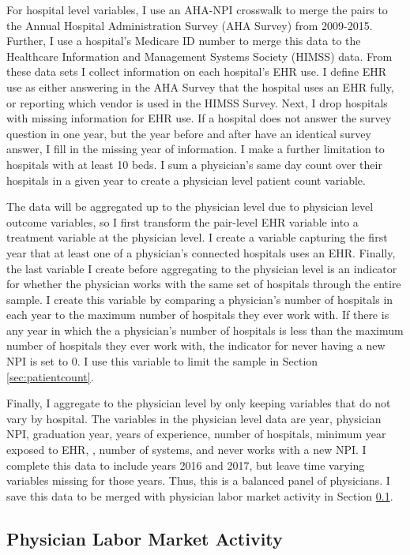 \documentclass[12pt]{article}
\begin{document}
For hospital level variables, I use an AHA-NPI crosswalk to merge the pairs to the Annual Hospital Administration Survey (AHA Survey) from 2009-2015. Further, I use a hospital's Medicare ID number to merge this data to the Healthcare Information and Management Systems Society (HIMSS) data. From these data sets I collect information on each hospital's EHR use. I define EHR use as either answering in the AHA Survey that the hospital uses an EHR fully, or reporting which vendor is used in the HIMSS Survey. Next, I drop hospitals with missing information for EHR use. If a hospital does not answer the survey question in one year, but the year before and after have an identical survey answer, I fill in the missing year of information. I make a further limitation to hospitals with at least 10 beds. I sum a physician's same day count over their hospitals in a given year to create a physician level patient count variable. 

The data will be aggregated up to the physician level due to physician level outcome variables, so I first transform the pair-level EHR variable into a treatment variable at the physician level. I create a variable capturing the first year that at least one of a physician's connected hospitals uses an EHR. Finally, the last variable I create before aggregating to the physician level is an indicator for whether the physician works with the same set of hospitals through the entire sample. I create this variable by comparing a physician's number of hospitals in each year to the maximum number of hospitals they ever work with. If there is any year in which the a physician's number of hospitals is less than the maximum number of hospitals they ever work with, the indicator for never having a new NPI is set to 0. I use this variable to limit the sample in Section \ref{sec:patientcount}. 

Finally, I aggregate to the physician level by only keeping variables that do not vary by hospital. The variables in the physician level data are year, physician NPI, graduation year, years of experience, number of hospitals, minimum year exposed to EHR, , number of systems, and never works with a new NPI. I complete this data to include years 2016 and 2017, but leave time varying variables missing for those years. Thus, this is a balanced panel of physicians. I save this data to be merged with physician labor market activity in Section \ref{sec:appmdppas}.

\subsection{Physician Labor Market Activity}\label{sec:appmdppas}
\end{document}
